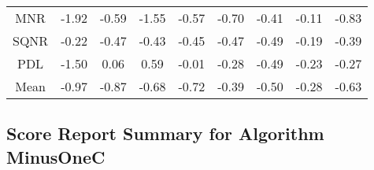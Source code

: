 \begin{longtable}{ | c || c | c | c | c | c | c | c || c |}
MNR &  \cellcolor[HTML]{FFCFCF} -1.92 &  \cellcolor[HTML]{FFEFEF} -0.59 &  \cellcolor[HTML]{FFD7D7} -1.55 &  \cellcolor[HTML]{FFEFEF} -0.57 &  \cellcolor[HTML]{FFEFEF} -0.70 &  \cellcolor[HTML]{FFF7F7} -0.41 &  \cellcolor[HTML]{FFFFFF} -0.11 &  \cellcolor[HTML]{FFE7E7} -0.83 \\
SQNR &  \cellcolor[HTML]{FFF7F7} -0.22 &  \cellcolor[HTML]{FFF7F7} -0.47 &  \cellcolor[HTML]{FFF7F7} -0.43 &  \cellcolor[HTML]{FFF7F7} -0.45 &  \cellcolor[HTML]{FFF7F7} -0.47 &  \cellcolor[HTML]{FFEFEF} -0.49 &  \cellcolor[HTML]{FFF7F7} -0.19 &  \cellcolor[HTML]{FFF7F7} -0.39 \\
PDL &  \cellcolor[HTML]{FFD7D7} -1.50 &  \cellcolor[HTML]{FFFFFF} 0.06 &  \cellcolor[HTML]{EFEFFF} 0.59 &  \cellcolor[HTML]{FFFFFF} -0.01 &  \cellcolor[HTML]{FFF7F7} -0.28 &  \cellcolor[HTML]{FFEFEF} -0.49 &  \cellcolor[HTML]{FFF7F7} -0.23 &  \cellcolor[HTML]{FFF7F7} -0.27 \\
\hline
\hline
Mean  &  \cellcolor[HTML]{FFE7E7} -0.97 &  \cellcolor[HTML]{FFE7E7} -0.87 &  \cellcolor[HTML]{FFEFEF} -0.68 &  \cellcolor[HTML]{FFEFEF} -0.72 &  \cellcolor[HTML]{FFF7F7} -0.39 &  \cellcolor[HTML]{FFEFEF} -0.50 &  \cellcolor[HTML]{FFF7F7} -0.28 &  \cellcolor[HTML]{FFEFEF} -0.63 \\
\hline
\end{longtable}

\subsection*{Score Report Summary for Algorithm MinusOneC}

